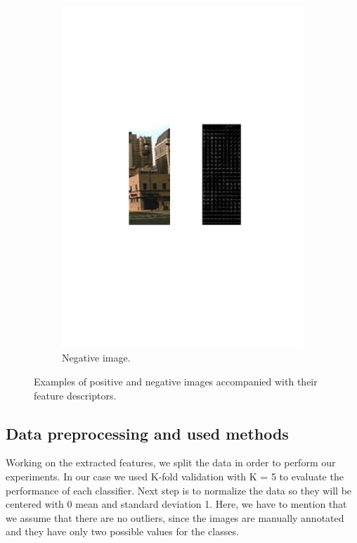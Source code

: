 \begin{figure}[h]
\begin{subfigure}[b]{0.45\textwidth}
    \includegraphics[width=\textwidth]{figures/negative_image.pdf}
    \caption{Negative image.}
  \end{subfigure}
  \caption{Examples of positive and negative images accompanied with their feature descriptors.}
  \label{fig:starting_images}
\end{figure}

\subsection{Data preprocessing and used methods}
\noindent Working on the extracted features, we split the data in order to perform our experiments. In our case we used K-fold validation with K = 5 to evaluate the performance of each classifier. Next step is to normalize the data so they will be centered with 0 mean and standard deviation 1. Here, we have to mention that we assume that there are no outliers, since the images are manually annotated and they have only two possible values for the classes.


